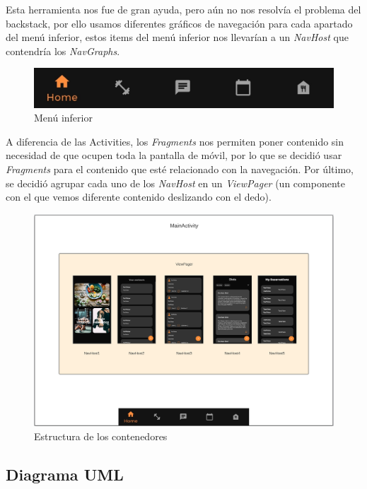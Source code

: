 \documentclass[12pt,a4paper]{article}
\begin{document}
Esta herramienta nos fue de gran ayuda, pero aún no nos resolvía el problema del backstack,
por ello usamos diferentes gráficos de navegación para cada apartado del menú inferior,
estos items del menú inferior nos llevarían a un \textit{NavHost} que contendría los \textit{NavGraphs}.

\begin{figure}[h]
  \centering
 \includegraphics[width=\textwidth]{bottom_menu}
 \caption{Menú inferior}
 \label{menuinferior}
\end{figure}


A diferencia de las Activities, los \textit{Fragments} nos permiten poner contenido sin necesidad de que ocupen toda la pantalla de móvil,
por lo que se decidió usar \textit{Fragments} para el contenido que esté relacionado con la navegación.
Por último, se decidió agrupar cada uno de los \textit{NavHost} en un \textit{ViewPager} (un componente con el que vemos diferente contenido deslizando con el dedo).

\begin{figure}[h]
  \centering
 \includegraphics[width=\textwidth]{layout_img}
 \caption{Estructura de los contenedores}
 \label{contenderos}
\end{figure}

\clearpage


\subsection{Diagrama UML}
\end{document}

